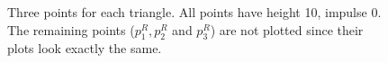 \begin{figure}[ht]

  \caption{Three points for each triangle. All points have height 10, impulse 0. The remaining points ($p_1^R, p_2^R$ and $p_3^R$) are not plotted since their plots look exactly the same.}
  \label{fig:three-points-equal}
\end{figure}


